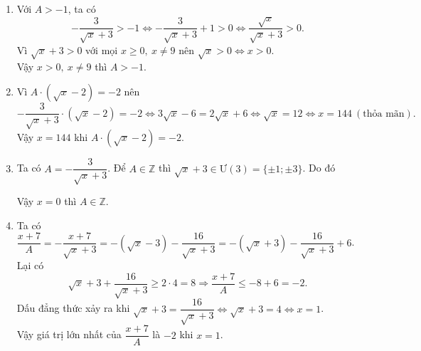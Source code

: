 \begin{bt}
{\begin{enumerate}
		Vậy $ 0\leq x<36,\ x\neq 9 $ thì $ A<-\dfrac{1}{3} $.
		\item Với $ A>-1 $, ta có
		\[ 
		-\dfrac{3}{\sqrt{x}+3}>-1\Leftrightarrow -\dfrac{3}{\sqrt{x}+3}+1>0\Leftrightarrow \dfrac{\sqrt{x}}{\sqrt{x}+3}>0.
		\]
		Vì $ \sqrt{x}+3>0 $ với mọi $ x\geq 0,\ x\neq 9 $ nên $ \sqrt{x}>0\Leftrightarrow x>0 $.\\
		Vậy $ x>0,\ x\neq 9 $ thì $ A>-1 $.
		\item Vì $ A\cdot (\sqrt{x}-2)=-2 $ nên
		\[ 
		-\dfrac{3}{\sqrt{x}+3}\cdot(\sqrt{x}-2)=-2\Leftrightarrow 3\sqrt{x}-6=2\sqrt{x}+6\Leftrightarrow\sqrt{x}=12\Leftrightarrow x=144\ (\text{thỏa mãn}).
		\]
		Vậy $ x=144 $ khi $ A\cdot (\sqrt{x}-2)=-2 $.
		\item Ta có $ A=-\dfrac{3}{\sqrt{x}+3} $. Để $ A\in \mathbb{Z} $ thì $ \sqrt{x}+3\in\text{Ư}(3)=\{\pm 1;\pm 3\} $. Do đó
		\begin{center}
		\end{center}
		Vậy $ x=0 $ thì $ A\in\mathbb{Z} $.
		\item Ta có $ \dfrac{x+7}{A}=-\dfrac{x+7}{\sqrt{x}+3}=-(\sqrt{x}-3)-\dfrac{16}{\sqrt{x}+3}=-(\sqrt{x}+3)-\dfrac{16}{\sqrt{x}+3}+6 $.\\
		Lại có
		\[ 
		\sqrt{x}+3+\dfrac{16}{\sqrt{x}+3}\geq 2\cdot 4=8\Rightarrow \dfrac{x+7}{A}\leq -8+6=-2.
		\]
		Dấu đẳng thức xảy ra khi $ \sqrt{x}+3=\dfrac{16}{\sqrt{x}+3}\Leftrightarrow \sqrt{x}+3=4\Leftrightarrow x=1 $.\\
		Vậy giá trị lớn nhất của $ \dfrac{x+7}{A} $ là $ -2 $ khi $ x=1 $.
	\end{enumerate}
}
\end{bt}
